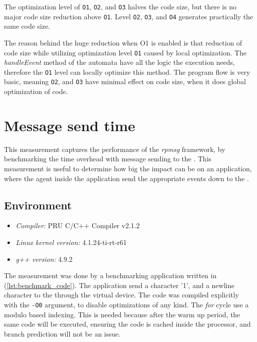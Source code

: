The optimization level of \texttt{O1}, \texttt{O2}, and \texttt{O3} halves the code size, but there is no major code size reduction above \texttt{O1}. Level \texttt{O2}, \texttt{O3}, and \texttt{O4} generates practically the same code size.

The reason behind the huge reduction when O1 is enabled is that reduction of code size while utilizing optimization level \texttt{O1} caused by local optimization. The \emph{handleEvent} method of the automata have all the logic the execution needs, therefore the \texttt{O1} level can locally optimize this method. The program flow is very basic, meaning \texttt{O2}, and \texttt{O3} have minimal effect on code size, when it does global optimization of code.

\section{Message send time}

This measurement captures the performance of the \emph{rpmsg} framework, by benchmarking the time overhead with message sending to the \pru{}. This measurement is useful to determine how big the impact can be on an application, where the agent inside the application send the appropriate events down to the \pru{}.

\subsection{Environment}
\begin{itemize}
	\item \emph{Compiler:} PRU C/C++ Compiler v2.1.2
	\item \emph{Linux kernel version:} 4.1.24-ti-rt-r61
	\item \emph{g++ version:} 4.9.2
\end{itemize}

The measurement was done by a benchmarking application written in \cpp{} (\cref{lst:benchmark_code}). The application send a character '1', and a newline character to the \pru{} through the virtual device. The code was compiled explicitly with the \texttt{-O0} argument, to disable optimizations of any kind. The \emph{for} cycle use a modulo based indexing. This is needed because after the warm up period, the same code will be executed, ensuring the code is cached inside the processor, and branch prediction will not be an issue.


